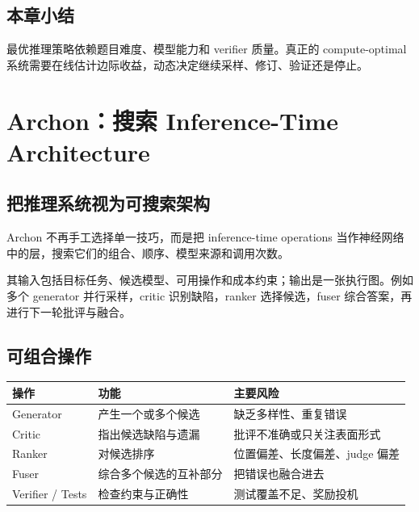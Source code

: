 \documentclass[a4paper]{article}
\begin{document}
\subsection{本章小结}

最优推理策略依赖题目难度、模型能力和 verifier 质量。真正的 compute-optimal 系统需要在线估计边际收益，动态决定继续采样、修订、验证还是停止。

\section{Archon：搜索 Inference-Time Architecture}

\subsection{把推理系统视为可搜索架构}

Archon 不再手工选择单一技巧，而是把 inference-time operations 当作神经网络中的层，搜索它们的组合、顺序、模型来源和调用次数。


其输入包括目标任务、候选模型、可用操作和成本约束；输出是一张执行图。例如多个 generator 并行采样，critic 识别缺陷，ranker 选择候选，fuser 综合答案，再进行下一轮批评与融合。

\subsection{可组合操作}


\begin{table}[H]
\centering
\small
\begin{tabular}{p{2.8cm}p{5.1cm}p{5.7cm}}
\toprule
\textbf{操作} & \textbf{功能} & \textbf{主要风险} \\
\midrule
Generator & 产生一个或多个候选 & 缺乏多样性、重复错误 \\
Critic & 指出候选缺陷与遗漏 & 批评不准确或只关注表面形式 \\
Ranker & 对候选排序 & 位置偏差、长度偏差、judge 偏差 \\
Fuser & 综合多个候选的互补部分 & 把错误也融合进去 \\
Verifier / Tests & 检查约束与正确性 & 测试覆盖不足、奖励投机 \\
\bottomrule
\end{tabular}
\end{table}
\end{document}
